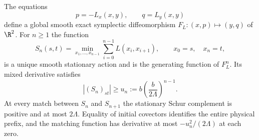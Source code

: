 \begin{lemma}
\label{lem:v79-convex-twist}
The equations
\[
             p=-L_x(x,y),\qquad q=L_y(x,y)
\]
define a global smooth exact symplectic diffeomorphism
$F_L:(x,p)\mapsto(y,q)$ of $\R^2$.  For $n\ge1$ the function
\begin{equation}\label{eq:v79-action-min}
 S_n(s,t)=\min_{x_1,\ldots,x_{n-1}}
             \sum_{i=0}^{n-1}L(x_i,x_{i+1}),
             \qquad x_0=s,\quad x_n=t,
\end{equation}
is a unique smooth stationary action and is the generating function
of $F_L^n$.  Its mixed derivative satisfies
\begin{equation}\label{eq:v79-twist-bound}
 |(S_n)_{st}|\ge u_n:=b\left(\frac{b}{2\Lambda}\right)^{n-1}.
\end{equation}
At every match between $S_n$ and $S_{n+1}$ the stationary Schur
complement is positive and at most $2\Lambda$.  Equality of initial
covectors identifies the entire physical prefix, and the matching
function has derivative at most $-u_n^2/(2\Lambda)$ at each zero.
\end{lemma}

